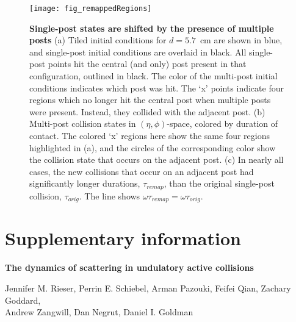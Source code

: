 \documentclass[aps,pre,twocolumn,superscriptaddress]{revtex4-1}
\begin{document}
\begin{figure*}[ht!]
	\texttt{[image: fig\_remappedRegions]}
	\caption{\textbf{Single-post states are shifted by the presence of multiple posts} (a) Tiled initial conditions for $d = 5.7$~cm are shown in blue, and single-post initial conditions are overlaid in black. All single-post points hit the central (and only) post present in that configuration, outlined in black. The color of the multi-post initial conditions indicates which post was hit. The `x' points indicate four regions which no longer hit the central post when multiple posts were present. Instead, they collided with the adjacent post. (b) Multi-post collision states in $(\eta,\phi)$-space, colored by duration of contact. The colored `x' regions here show the same four regions highlighted in (a), and the circles of the corresponding color show the collision state that occurs on the adjacent post. (c) In nearly all cases, the new collisions that occur on an adjacent post had significantly longer durations, $\tau_{remap}$, than the original single-post collision, $\tau_{orig}$. The line shows $\omega\tau_{remap} = \omega \tau_{orig}$.}
	\label{fig:remappedRegions}
\end{figure*}


	

\clearpage
\onecolumngrid
\appendix*
\setcounter{figure}{0}

\makeatletter 
\renewcommand{\thefigure}{S\@arabic\c@figure}
\makeatother

\setcounter{table}{0}

\makeatletter 
\renewcommand{\thetable}{S\@arabic\c@table}
\makeatother

\setcounter{page}{1}

\makeatletter
\renewcommand{\thepage}{S\arabic{page}} 
\makeatother




\section*{Supplementary information}
\begin{center}
	\textbf{The dynamics of scattering in undulatory active collisions}
	
	Jennifer M. Rieser, Perrin E. Schiebel, Arman Pazouki, Feifei Qian, Zachary Goddard,\\ Andrew Zangwill,
	Dan Negrut, Daniel I. Goldman
\end{center}
\end{document}
